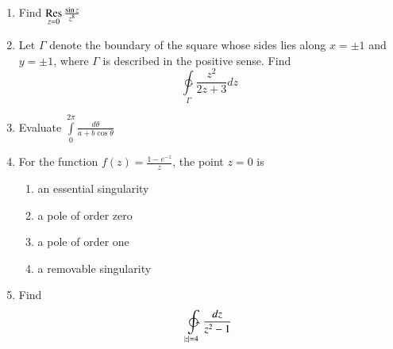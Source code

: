 \documentclass[journal,12pt,twocolumn]{IEEEtran}
\begin{document}
\begin{enumerate}[1.]
\item Find $\operatorname*{Res}\limits_{z=0} \frac{\sin z}{z^8}$


\item Let $\Gamma$ denote the boundary of the square whose sides lies along $ x= \pm 1$ and $y= \pm 1$, where $\Gamma$ is described in the positive sense.
Find
\begin{equation}
\ointctrclockwise\limits_{\Gamma}\frac{z^2}{2z + 3} dz
\end{equation}
%
%
%
%
%
%

\item Evaluate $\int\limits_{0}^{2 \pi} \frac{d \theta}{a+b \cos \theta}$

\item For the function $f(z)=\frac{1-e^{-z}}{z}$, the point $z=0$ is


\begin{enumerate}%

\item 
an essential singularity

\item 
a pole of order zero

\item 
a pole of order one

\item 
a removable singularity

\end{enumerate}

\item Find
\begin{equation}
\ointctrclockwise\limits_{\abs{z}=4} \frac{dz}{z^2-1}
\end{equation}

%
%
%
%
%
%


\end{enumerate}
\end{document}
